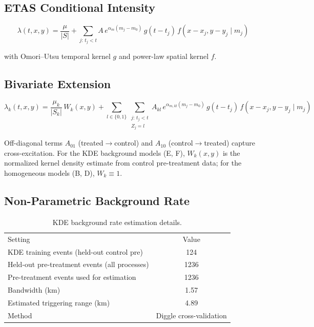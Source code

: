 \documentclass[
]{article}
\begin{document}
\subsection{ETAS Conditional
Intensity}\label{etas-conditional-intensity}

\[
\lambda(t,x,y) = \frac{\mu}{|S|} + \sum_{j:\,t_j<t} A\,e^{\alpha_m(m_j-m_0)}\,g(t-t_j)\,f(x-x_j,y-y_j\mid m_j)
\]

with Omori--Utsu temporal kernel \(g\) and power-law spatial kernel
\(f\).

\subsection{Bivariate Extension}\label{bivariate-extension}

\[
\lambda_k(t,x,y) = \frac{\mu_k}{|S_k|}\,W_k(x,y) + \sum_{l\in\{0,1\}}\sum_{\substack{j:\,t_j<t\\Z_j=l}} A_{kl}\,e^{\alpha_{m,kl}(m_j-m_0)}\,g(t-t_j)\,f(x-x_j,y-y_j\mid m_j)
\]

Off-diagonal terms \(A_{01}\) (treated\(\to\)control) and \(A_{10}\)
(control\(\to\)treated) capture cross-excitation. For the KDE background
models (E, F), \(W_k(x,y)\) is the normalized kernel density estimate
from control pre-treatment data; for the homogeneous models (B, D),
\(W_k \equiv 1\).

\subsection{Non-Parametric Background
Rate}\label{non-parametric-background-rate}

\begin{longtable}[t]{lc}

\caption{\label{tbl-kde}KDE background rate estimation details.}

\tabularnewline

\\
\toprule
Setting & Value\\
\midrule
KDE training events (held-out control pre) & 124\\
Held-out pre-treatment events (all processes) & 1236\\
Pre-treatment events used for estimation & 1236\\
Bandwidth (km) & 1.57\\
Estimated triggering range (km) & 4.89\\
\addlinespace
Method & Diggle cross-validation\\
\bottomrule

\end{longtable}
\end{document}
